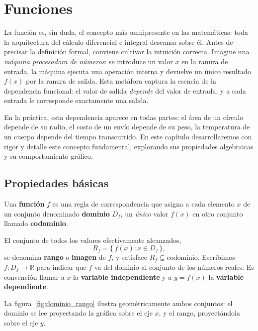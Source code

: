 \chapter{Funciones}\label{funciones}

La función es, sin duda, el concepto más omnipresente en las matemáticas: toda la arquitectura del cálculo diferencial e integral descansa sobre él. Antes de precisar la definición formal, conviene cultivar la intuición correcta. Imagine una \emph{máquina procesadora de números}: se introduce un valor $x$ en la ranura de entrada, la máquina ejecuta una operación interna y devuelve un único resultado $f(x)$ por la ranura de salida. Esta metáfora captura la esencia de la dependencia funcional: el valor de salida \emph{depende} del valor de entrada, y a cada entrada le corresponde exactamente una salida.

En la práctica, esta dependencia aparece en todas partes: el área de un círculo depende de su radio, el costo de un envío depende de su peso, la temperatura de un cuerpo depende del tiempo transcurrido. En este capítulo desarrollaremos con rigor y detalle este concepto fundamental, explorando sus propiedades algebraicas y su comportamiento gráfico.


\section{Propiedades básicas}

\begin{definition}[Función]
Una \textbf{función} $f$ es una regla de correspondencia que asigna a cada elemento $x$ de un conjunto denominado \textbf{dominio} $D_f$, un \emph{único} valor $f(x)$ en otro conjunto llamado \textbf{codominio}. 

El conjunto de todos los valores efectivamente alcanzados,
\[
  R_f = \{\, f(x) : x \in D_f \,\},
\]
se denomina \textbf{rango} o \textbf{imagen} de $f$, y satisface $R_f \subseteq \text{codominio}$. Escribimos $f: D_f \to \mathbb{R}$ para indicar que $f$ va del dominio al conjunto de los números reales. Es convención llamar a $x$ la \textbf{variable independiente} y a $y = f(x)$ la \textbf{variable dependiente}.
\end{definition}

La figura~\ref{fig:dominio_rango} ilustra geométricamente ambos conjuntos:
el dominio se lee proyectando la gráfica sobre el eje $x$, y el rango,
proyectándola sobre el eje $y$.

